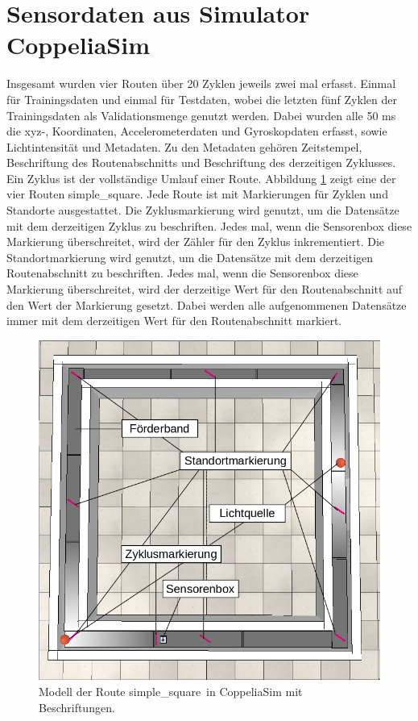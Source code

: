 \section{Sensordaten aus Simulator CoppeliaSim}
Insgesamt wurden vier Routen über 20 Zyklen jeweils zwei mal erfasst.
Einmal für Trainingsdaten und einmal für Testdaten, wobei die letzten fünf Zyklen der
Trainingsdaten als Validationsmenge genutzt werden.
Dabei wurden alle 50 ms die xyz-, Koordinaten, Accelerometerdaten und Gyroskopdaten erfasst, sowie Lichtintensität und Metadaten.
Zu den Metadaten gehören Zeitstempel, Beschriftung des Routenabschnitts und Beschriftung des derzeitigen Zyklusses.
Ein Zyklus ist der vollständige Umlauf einer Route.
\newpage
Abbildung \ref{fig:simple_square_labeled} zeigt eine der vier Routen \glqq simple\_square\grqq.
Jede Route ist mit Markierungen für Zyklen und Standorte ausgestattet.
Die Zyklusmarkierung wird genutzt, um die Datensätze mit dem derzeitigen Zyklus zu beschriften.
Jedes mal, wenn die Sensorenbox diese Markierung überschreitet, wird der Zähler für den Zyklus inkrementiert.
Die Standortmarkierung wird genutzt, um die Datensätze mit dem derzeitigen Routenabschnitt zu beschriften.
Jedes mal, wenn die Sensorenbox diese Markierung überschreitet, wird der derzeitige Wert für den Routenabschnitt auf den Wert der Markierung gesetzt.
Dabei werden alle aufgenommenen Datensätze immer mit dem derzeitigen Wert für den Routenabschnitt markiert.
\begin{figure}[h!]
    \centering
    \includegraphics[width=\linewidth]{images/simple_square_labeled.png}
    \caption{Modell der Route \glqq simple\_square\grqq\ in CoppeliaSim mit Beschriftungen.}
    \label{fig:simple_square_labeled}
\end{figure}
